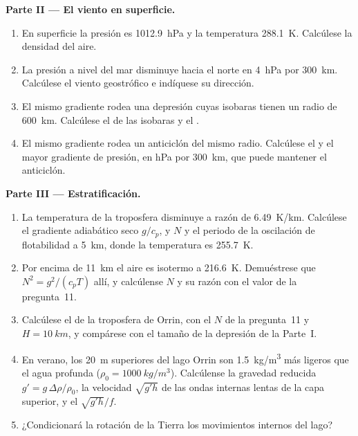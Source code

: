 \begin{problem}
\medskip\noindent\textbf{Parte II --- El viento en superficie.}
\begin{enumerate}[resume]
\item En superficie la presión es \qty{1012.9}{hPa} y la temperatura
  \qty{288.1}{K}. Calcúlese la densidad del aire.
\item La presión a nivel del mar disminuye hacia el norte en \qty{4}{hPa} por
  \qty{300}{km}. Calcúlese el viento geostrófico e indíquese su dirección.
\item El mismo gradiente rodea una depresión cuyas isobaras tienen un radio
  de \qty{600}{km}. Calcúlese el  de las isobaras y el
  .
\item El mismo gradiente rodea un anticiclón del mismo radio.
  Calcúlese el  y el mayor gradiente de presión, en
  \unit{hPa} por \qty{300}{km}, que puede mantener el anticiclón.
\end{enumerate}

\medskip\noindent\textbf{Parte III --- Estratificación.}
\begin{enumerate}[resume]
\item La temperatura de la troposfera disminuye a razón de \qty{6.49}{K/km}.
  Calcúlese el gradiente adiabático seco $g/c_p$, y $N$ y el periodo de
  la oscilación de flotabilidad a \qty{5}{km}, donde la temperatura es
  \qty{255.7}{K}.
\item Por encima de \qty{11}{km} el aire es isotermo a \qty{216.6}{K}. Demuéstrese que
  $N^2 = g^2/(c_pT)$ allí, y calcúlense $N$ y su razón con el valor de
  la pregunta~11.
\item Calcúlese el  de la troposfera de Orrin, con el $N$ de
  la pregunta~11 y $H = \qty{10}{km}$, y compárese con el tamaño de la
  depresión de la Parte~I.
\item En verano, los \qty{20}{m} superiores del lago Orrin son
  \qty{1.5}{kg/m^3} más ligeros que el agua profunda ($\rho_0 = \qty{1000}{kg/m^3}$). Calcúlense
  la gravedad reducida $g' = g\,\Delta\rho/\rho_0$, la velocidad $\sqrt{g'h}$ de
  las ondas internas lentas de la capa superior, y el 
  $\sqrt{g'h}/f$.
\item ¿Condicionará la rotación de la Tierra los movimientos internos del lago?
\end{enumerate}


\end{problem}
